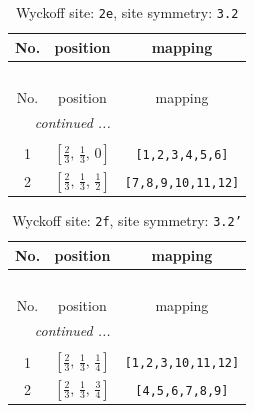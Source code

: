 \documentclass[fleqn,8pt]{jsarticle}
\begin{document}
\begin{longtable}{ccc}
\caption{Wyckoff site: {\tt 2e}, site symmetry: {\tt 3.2}}
 \\
 \hline \hline
No. & position & mapping \\ \hline \endfirsthead

\multicolumn{2}{l}{\tablename\ \thetable{}} \\
 \hline \hline
No. & position & mapping \\ \hline \endhead

 \hline \hline
\multicolumn{2}{r}{\footnotesize\it continued ...} \\ \endfoot

 \hline \hline
\multicolumn{2}{r}{} \\ \endlastfoot

1 & $\left[ \frac{2}{3},\, \frac{1}{3},\, 0 \right]$ & {\tt [1,2,3,4,5,6]} \\ \hline
2 & $\left[ \frac{2}{3},\, \frac{1}{3},\, \frac{1}{2} \right]$ & {\tt [7,8,9,10,11,12]} \\
\end{longtable}
\renewcommand{\arraystretch}{1.2}
\begin{longtable}{ccc}
\caption{Wyckoff site: {\tt 2f}, site symmetry: {\tt 3.2'}}
 \\
 \hline \hline
No. & position & mapping \\ \hline \endfirsthead

\multicolumn{2}{l}{\tablename\ \thetable{}} \\
 \hline \hline
No. & position & mapping \\ \hline \endhead

 \hline \hline
\multicolumn{2}{r}{\footnotesize\it continued ...} \\ \endfoot

 \hline \hline
\multicolumn{2}{r}{} \\ \endlastfoot

1 & $\left[ \frac{2}{3},\, \frac{1}{3},\, \frac{1}{4} \right]$ & {\tt [1,2,3,10,11,12]} \\ \hline
2 & $\left[ \frac{2}{3},\, \frac{1}{3},\, \frac{3}{4} \right]$ & {\tt [4,5,6,7,8,9]} \\
\end{longtable}
\renewcommand{\arraystretch}{1.2}
\end{document}
